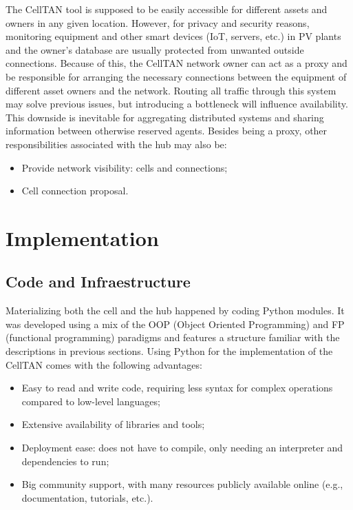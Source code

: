 The CellTAN tool is supposed to be easily accessible for different assets and owners in any given location. However, for privacy and security reasons, monitoring equipment and other smart devices (IoT, servers, etc.) in PV plants and the owner's database are usually protected from unwanted outside connections. Because of this, the CellTAN network owner can act as a proxy and be responsible for arranging the necessary connections between the equipment of different asset owners and the network. Routing all traffic through this system may solve previous issues, but introducing a bottleneck will influence availability. This downside is inevitable for aggregating distributed systems and sharing information between otherwise reserved agents. Besides being a proxy, other responsibilities associated with the hub may also be:

\begin{itemize}
    \item Provide network visibility: cells and connections;
    \item Cell connection proposal.
\end{itemize}


\section{Implementation}

\subsection{Code and Infraestructure}

Materializing both the cell and the hub happened by coding Python modules. It was developed using a mix of the OOP (Object Oriented Programming) and FP (functional programming) paradigms and features a structure familiar with the descriptions in previous sections. Using Python for the implementation of the CellTAN comes with the following advantages:

\begin{itemize}
    \item Easy to read and write code, requiring less syntax for complex operations compared to low-level languages;
    \item Extensive availability of libraries and tools;
    \item Deployment ease: does not have to compile, only needing an interpreter and dependencies to run;
    \item Big community support, with many resources publicly available online (e.g., documentation, tutorials, etc.). 
\end{itemize}


